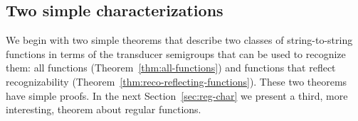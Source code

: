 




\subsection{Two simple characterizations}
We begin with two simple theorems that describe two classes of string-to-string functions in terms of the transducer semigroups that can be used to recognize them: all functions (Theorem~\ref{thm:all-functions}) and functions that reflect recognizability (Theorem~\ref{thm:reco-reflecting-functions}). These two theorems have simple proofs. In the next Section~\ref{sec:reg-char} we present a third, more  interesting, theorem about  regular functions.

